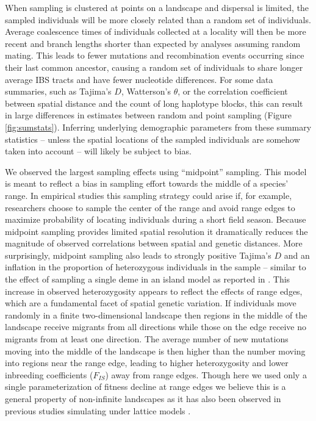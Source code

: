 \documentclass[10pt,twoside,lineno,hidelinks]{preprint}
\begin{document}
When sampling is clustered at points on a landscape and dispersal is limited, the sampled individuals will be more closely related than a random set of individuals. Average coalescence times of individuals collected at a locality will then be more recent and branch lengths shorter than expected by analyses assuming random mating. This leads to fewer mutations and recombination events occurring since their last common ancestor, causing a random set of individuals to share longer average IBS tracts and have fewer nucleotide differences. For some data summaries, such as Tajima's $D$, Watterson's $\theta$, or the correlation coefficient between spatial distance and the count of long haplotype blocks, this can result in large differences in estimates between random and point sampling (Figure \ref{fig:sumstats}). 
Inferring underlying demographic parameters from these summary statistics 
-- unless the spatial locations of the sampled individuals are somehow taken into account 
-- will likely be subject to bias.

We observed the largest sampling effects using ``midpoint'' sampling.
This model is meant to reflect a bias in sampling effort towards the middle of a species' range. 
In empirical studies this sampling strategy could arise if, for example, 
researchers choose to sample the center of the range and avoid range edges to maximize probability of locating individuals during a short field season. 
Because midpoint sampling provides limited spatial resolution it dramatically reduces the magnitude of observed correlations between spatial and genetic distances. 
More surprisingly, midpoint sampling also leads to strongly positive Tajima's $D$ and an inflation in the proportion of heterozygous individuals in the sample -- similar to the effect of sampling a single deme in an island model as reported in \citet{Stadler2009}. 
This increase in observed heterozygosity appears to reflect the effects of range edges, which are a fundamental facet of spatial genetic variation. 
If individuals move randomly in a finite two-dimensional landscape then regions in the middle of the landscape receive migrants from all directions while those on the edge receive no migrants from at least one direction. The average number of new mutations moving into the middle of the landscape is then higher than the number moving into regions near the range edge, leading to higher heterozygosity and lower inbreeding coefficients ($F_{IS}$) away from range edges. Though here we used only a single parameterization of fitness decline at range edges we believe this is a general property of non-infinite landscapes as it has also been observed in previous studies simulating under lattice models \citep{Neel2013,Shirk2014}. 
\end{document}
